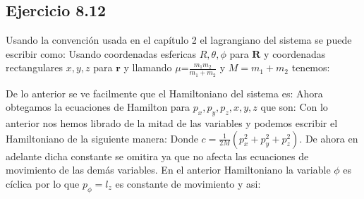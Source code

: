 \subsection*{Ejercicio 8.12}
Usando la convenci\'on usada en el cap\'itulo 2 el lagrangiano del sistema se puede escribir como:
Usando coordenadas esfericas $R,\theta,\phi$ para $\textbf{R}$ y coordenadas rectangulares $x,y,z$ para $\textbf{r}$ y llamando $\mu$=$\frac{m_1 m_2}{m_1+m_2}$ y $M=m_1+m_2$ tenemos:

De lo anterior se ve facilmente que el Hamiltoniano del sistema es:
Ahora obtegamos la ecuaciones de Hamilton para $p_x, p_y ,p_z, x, y ,z$ que son:
Con lo anterior nos hemos librado de la mitad de las variables y podemos escribir el Hamiltoniano de la siguiente manera:
Donde $c=\frac{1}{2 M}\left(p_x^2+p_y^2+p_z^2\right)$. De ahora en adelante dicha constante se omitira ya que no afecta las ecuaciones de movimiento de las dem\'as variables. En el anterior Hamiltoniano la variable $\phi$ es c\'iclica por lo que $p_\phi=l_z$ es constante de movimiento y asi:
